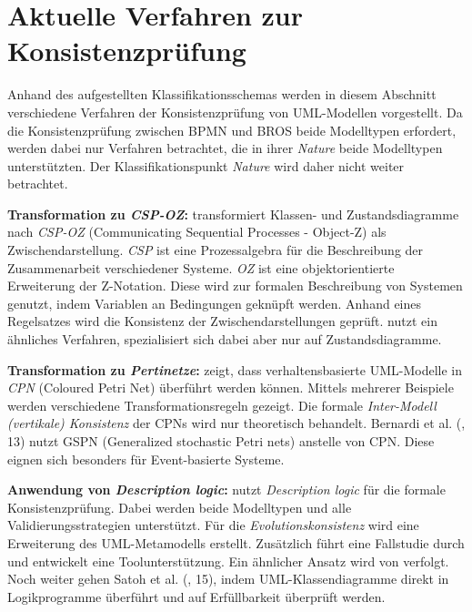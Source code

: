 \section{Aktuelle Verfahren zur Konsistenzprüfung}

Anhand des aufgestellten Klassifikationsschemas werden in diesem Abschnitt verschiedene Verfahren der Konsistenzprüfung von UML-Modellen vorgestellt.
Da die Konsistenzprüfung zwischen BPMN und BROS beide Modelltypen erfordert, werden dabei nur Verfahren betrachtet, die in ihrer \emph{Nature} beide Modelltypen unterstützten.
Der Klassifikationspunkt \emph{Nature} wird daher nicht weiter betrachtet.

\textbf{Transformation zu \emph{CSP-OZ}:}
\cite{Rasch2003} transformiert Klassen- und Zustandsdiagramme nach \emph{CSP-OZ} (Communicating Sequential Processes - Object-Z) als Zwischendarstellung.
\emph{CSP} ist eine Prozessalgebra für die Beschreibung der Zusammenarbeit verschiedener Systeme. 
\emph{OZ} ist eine objektorientierte Erweiterung der Z-Notation.
Diese wird zur formalen Beschreibung von Systemen genutzt, indem Variablen an Bedingungen geknüpft werden.
Anhand eines Regelsatzes wird die Konsistenz der Zwischendarstellungen geprüft.
\cite{Kim2004} nutzt ein ähnliches Verfahren, spezialisiert sich dabei aber nur auf Zustandsdiagramme.

\textbf{Transformation zu \emph{Pertinetze}:}
\cite{Shinkawa2006} zeigt, dass verhaltensbasierte UML-Modelle in \emph{CPN} (Coloured Petri Net) überführt werden können.
Mittels mehrerer Beispiele werden verschiedene Transformationsregeln gezeigt.
Die formale \emph{Inter-Modell (vertikale) Konsistenz} der CPNs wird nur theoretisch behandelt.
Bernardi et al. (\cite{Usman2008}, 13) nutzt GSPN (Generalized stochastic Petri nets) anstelle von CPN.
Diese eignen sich besonders für Event-basierte Systeme.

\textbf{Anwendung von \emph{Description logic}:}
\cite{Mens2005} nutzt \emph{Description logic} für die formale Konsistenzprüfung.
Dabei werden beide Modelltypen und alle Validierungsstrategien unterstützt.
Für die \emph{Evolutionskonsistenz} wird eine Erweiterung des UML-Metamodells erstellt.
Zusätzlich führt \cite{Mens2005} eine Fallstudie durch und entwickelt eine Toolunterstützung.
Ein ähnlicher Ansatz wird von \cite{Simmonds2004} verfolgt.
Noch weiter gehen Satoh et al. (\cite{Usman2008}, 15), indem UML-Klassendiagramme direkt in Logikprogramme überführt und auf Erfüllbarkeit überprüft werden.

